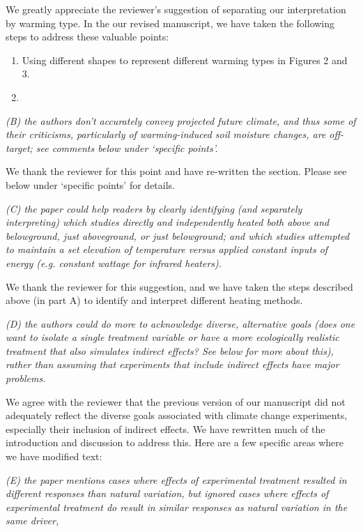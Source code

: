 \documentclass[11pt,a4paper]{letter}
\begin{document}
\begin{letter}{}
We greatly appreciate the reviewer's suggestion of separating our interpretation by warming type. In the our revised manuscript, we have taken the following steps to address these valuable points:
\begin{enumerate}
\item Using different shapes to represent different warming types in Figures 2 and 3.
\item
\end{enumerate}


\emph{(B) the authors don't accurately convey projected future climate, and thus some of their criticisms, particularly of warming-induced soil moisture changes, are off-target; see comments below under `specific points'.}

We thank the reviewer for this point and have re-written the section. Please see below under `specific points' for details.

\emph{(C) the paper could help readers by clearly identifying (and separately interpreting) which studies directly and independently heated both above and belowground, just aboveground, or just belowground; and which studies attempted to maintain a set elevation of temperature versus applied constant inputs of energy (e.g. constant wattage for infrared heaters).}

We thank the reviewer for this suggestion, and we have taken the steps described above (in part A) to identify and interpret different heating methods.

\emph{(D) the authors could do more to acknowledge diverse, alternative goals (does one want to isolate a single treatment variable or have a more ecologically realistic treatment that also simulates indirect effects? See below for more about this), rather than assuming that experiments that include indirect effects have major problems.}

We agree with the reviewer that the previous version of our manuscript did not adequately reflect the diverse goals associated with climate change experiments, especially their inclusion of indirect effects. We have rewritten much of the introduction and discussion to address this. Here are a few specific areas where we have modified text:



\emph{(E) the paper mentions cases where effects of experimental treatment resulted in different responses than natural variation, but ignored cases where effects of experimental treatment do result in similar responses as natural variation in the same driver,}


\end{letter}
\end{document}
